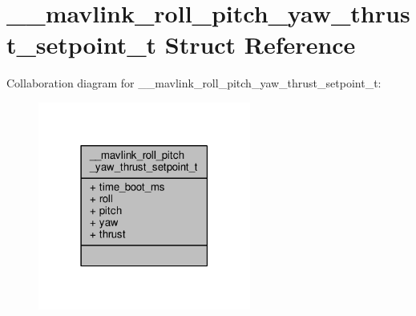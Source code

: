 \hypertarget{struct____mavlink__roll__pitch__yaw__thrust__setpoint__t}{\section{\+\_\+\+\_\+mavlink\+\_\+roll\+\_\+pitch\+\_\+yaw\+\_\+thrust\+\_\+setpoint\+\_\+t Struct Reference}
\label{struct____mavlink__roll__pitch__yaw__thrust__setpoint__t}
}


Collaboration diagram for \+\_\+\+\_\+mavlink\+\_\+roll\+\_\+pitch\+\_\+yaw\+\_\+thrust\+\_\+setpoint\+\_\+t\+:
\nopagebreak
\begin{figure}[H]
\begin{center}
\leavevmode
\includegraphics[width=198pt]{struct____mavlink__roll__pitch__yaw__thrust__setpoint__t__coll__graph}
\end{center}
\end{figure}
